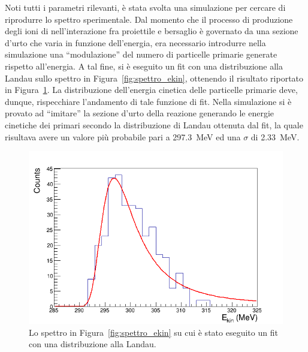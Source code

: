 Noti tutti i parametri rilevanti, è stata svolta una simulazione per cercare di riprodurre lo spettro sperimentale. 
Dal momento che il processo di produzione degli ioni di  nell'interazione fra proiettile e bersaglio è governato da una sezione d'urto che varia in funzione dell'energia, era necessario introdurre nella simulazione una ``modulazione'' del numero di particelle primarie generate rispetto all'energia.
A tal fine, si è eseguito un fit con una distribuzione alla Landau sullo spettro in Figura~\ref{fig:spettro_ekin}, ottenendo il risultato riportato in Figura~\ref{fig:spettro_ekin_fit}.
La distribuzione dell'energia cinetica delle particelle primarie deve, dunque, rispecchiare l'andamento di tale funzione di fit.
Nella simulazione si è provato ad ``imitare'' la sezione d'urto della reazione generando le energie cinetiche dei primari secondo la distribuzione di Landau ottenuta dal fit, la quale risultava avere un valore più probabile pari a 297.3~MeV ed una $\sigma$ di 2.33~MeV.



\begin{figure} [!t]
	\centering
	\includegraphics[width=\textwidth, keepaspectratio]{Grafici_Tesi/Test/spettro_ekin_fit.png}
	\caption{Lo spettro in Figura~\ref{fig:spettro_ekin} su cui è stato eseguito un fit con una distribuzione alla Landau.} \label{fig:spettro_ekin_fit}
\end{figure}

